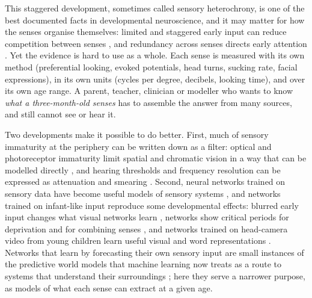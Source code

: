 \documentclass{article}
\begin{document}
This staggered development, sometimes called sensory heterochrony, is one of the best documented facts in developmental neuroscience, and it may matter for how the senses organise themselves: limited and staggered early input can reduce competition between senses \autocite{turkewitz1982limitations}, and redundancy across senses directs early attention \autocite{bahrick2000intersensory}. Yet the evidence is hard to use as a whole. Each sense is measured with its own method (preferential looking, evoked potentials, head turns, sucking rate, facial expressions), in its own units (cycles per degree, decibels, looking time), and over its own age range. A parent, teacher, clinician or modeller who wants to know \emph{what a three-month-old senses} has to assemble the answer from many sources, and still cannot see or hear it.

Two developments make it possible to do better. First, much of sensory immaturity at the periphery can be written down as a filter: optical and photoreceptor immaturity limit spatial and chromatic vision in a way that can be modelled directly \autocite{banks1988optical}, and hearing thresholds and frequency resolution can be expressed as attenuation and smearing \autocite{werner2007issues}. Second, neural networks trained on sensory data have become useful models of sensory systems \autocite{yamins2016using}, and networks trained on infant-like input reproduce some developmental effects: blurred early input changes what visual networks learn \autocite{vogelsang2018potential,vogelsang2024impact,avbersek2021training,jang2021convolutional}, networks show critical periods for deprivation and for combining senses \autocite{achille2019critical,kleinman2023critical}, and networks trained on head-camera video from young children learn useful visual and word representations \autocite{orhan2024learning,vong2024grounded,sheybani2023curriculum}. Networks that learn by forecasting their own sensory input are small instances of the predictive world models that machine learning now treats as a route to systems that understand their surroundings \autocite{ha2018world,lecun2022path,li2025words}; here they serve a narrower purpose, as models of what each sense can extract at a given age.
\end{document}
